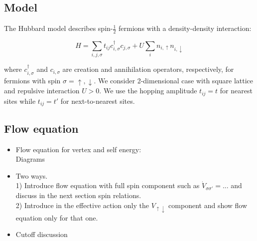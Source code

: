 \subsection{Model}

The Hubbard model describes spin-$\frac{1}{2}$ fermions with a density-density interaction:

\begin{equation}
H = \sum_{i,j,\sigma} t_{ij} c^{\dagger}_{i,\sigma} c_{j,\sigma} + U \sum_{i} n_{i,\uparrow} n_{i,\downarrow}
\end{equation}

where $c^{\dagger}_{i,\sigma}$ and $c_{i,\sigma}$ are creation and annihilation operators, respectively, 
for fermions with spin $\sigma=\uparrow,\downarrow$. We consider 2-dimensional case with square lattice and repulsive interaction $U>0$. We use the hopping amplitude $t_{ij} = t$ for nearest sites while $t_{ij}=t'$ for next-to-nearest sites.

\subsection{Flow equation}

\begin{itemize}

\item
Flow equation for vertex and self energy:
\\
Diagrams
\\

\item Two ways. 
\\
1) Introduce flow equation with full spin component such as $\dot{V}_{\sigma \sigma'} = ...$ and discuss in the next section spin relations.
\\
2) Introduce in the effective action only the $V_{\uparrow \downarrow}$ component and show flow equation 
only for that one.

\item Cutoff discussion

\end{itemize}